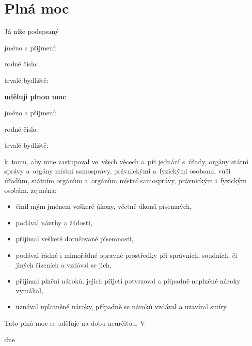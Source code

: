 \documentclass{article}
\newcommand\HandwrittenText[1]{%
  \parbox[t]{#1}{%
    \centering
    \dotfill\par
    \nointerlineskip\vspace{2pt}
  }%
}
\begin{document}

\section*{\centering Plná moc}
Já níže podepsaný \par
jméno a přijmení:\HandwrittenText{5cm}{} \par
 rodné číslo:\HandwrittenText{6cm}{} \par
 trvalé bydliště:\HandwrittenText{5.43cm}{} \par
 \HandwrittenText{7.75cm}{} \par
\begin{center}
  \textbf{uděluji plnou moc}
\end{center}
 jméno a přijmení:\HandwrittenText{5cm}{} \par
 rodné číslo:\HandwrittenText{6cm}{} \par
 trvalé bydliště:\HandwrittenText{5.43cm}{} \par
 \HandwrittenText{7.75cm}{} \par
 \vskip 0.5cm
k~tomu, aby mne zastupoval ve~všech věcech a~při jednání s~úřady, orgány státní správy a~orgány místní samosprávy, právnickými a~fyzickými osobami, vůči úřadům, státním orgánům a~orgánům místní samosprávy, právnickým i~fyzickým osobám, zejména:

\begin{itemize}
    \setlength\itemsep{-0.15cm}
  \item činil mým jménem veškeré úkony, včetně úkonů písemných,
  \item podával návrhy a žádosti,
  \item přijímal veškeré doručované písemnosti,
  \item podával řádné i mimořádné opravné prostředky při správních, soudních, či jiných řízeních a vzdával se jich,
  \item přijímal plnění nároků, jejich přijetí potvrzoval a případně neplněné nároky vymáhal,
  \item uznával uplatněné nároky, případně se nároků vzdával a uzavíral smíry
\end{itemize}

Tato plná moc se uděluje na dobu neurčitou.
\vskip 0.5cm
V \HandwrittenText{3cm} dne \HandwrittenText{3cm} \\
\vskip 0.5cm
\HandwrittenText{7.2cm}
\end{document}
